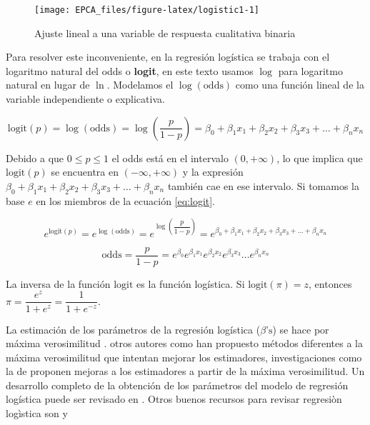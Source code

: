 \documentclass[letterpaper,]{book}
\begin{document}
\begin{figure}[!h]

{\centering \texttt{[image: EPCA\_files/figure-latex/logistic1-1]} 

}

\caption{Ajuste lineal a una variable de respuesta cualitativa binaria}\label{fig:logistic1}
\end{figure}

Para resolver este inconveniente, en la regresión logística se trabaja con el logaritmo natural del odds o \textbf{logit}, en este texto usamos \(\log\) para logaritmo natural en lugar de \(\ln\). Modelamos el \(\log\left(\text{odds}\right)\) como una función lineal de la variable independiente o explicativa.

\begin{equation}
\text{logit}\left(p\right) = \log \left(\text{odds}\right) =  \log \left( \dfrac{p}{1-p}\right) = \beta_0 + \beta_1 x_1 + \beta_2 x_2 + \beta_3 x_3 + \ldots + \beta_n x_n
    \label{eq:logit}
\end{equation}

Debido a que \(0 \leq p \leq 1\) el odds está en el intervalo \(\left( 0, + \infty \right)\), lo que implica que \(\text{logit}\left(p\right)\) se encuentra en \(\left( -\infty , + \infty \right)\) y la expresión \(\beta_0 + \beta_1 x_1 + \beta_2 x_2 + \beta_3 x_3 + \ldots + \beta_n x_n\) también cae en ese intervalo. Si tomamos la base \(e\) en los miembros de la ecuación \eqref{eq:logit}.

\begin{equation}
  e^{\text{logit}\left(p\right)} = e^{\log \left(\text{odds}\right)} =  e^{\log \left( \dfrac{p}{1-p}\right)} = e^{\beta_0 + \beta_1 x_1 + \beta_2 x_2 + \beta_3 x_3 + \ldots + \beta_n x_n }
    \label{eq:logit2}
\end{equation}

\begin{equation}
   \text{odds} =  \dfrac{p}{1-p} = e^{\beta_0}e^{\beta_1 x_1}e^{\beta_2 x_2}e^{ \beta_3 x_3}\ldots e^{\beta_n x_n}
    \label{eq:logit3}
\end{equation}

La inversa de la función \(\text{logit}\) es la función logística. Si \(\text{logit}\left(\pi\right)=z\), entonces \(\pi = \dfrac{e^z}{1+e^z} = \dfrac{1}{1+e^{-z}}\).

La estimación de los parámetros de la regresión logística (\(\beta\text{'s}\)) se hace por máxima verosimilitud \citep{albert1984}. otros autores como \citet{lecessie92} han propuesto métodos diferentes a la máxima verosimilitud que intentan mejorar los estimadores, investigaciones como la de \citet{breslow97} proponen mejoras a los estimadores a partir de la máxima verosimilitud. Un desarrollo completo de la obtención de los parámetros del modelo de regresión logística puede ser revisado en \citet{hosmer2013}. Otros buenos recursos para revisar regresiòn logìstica son \citet{hibe2017} y \citet{hibe2015}
\end{document}
